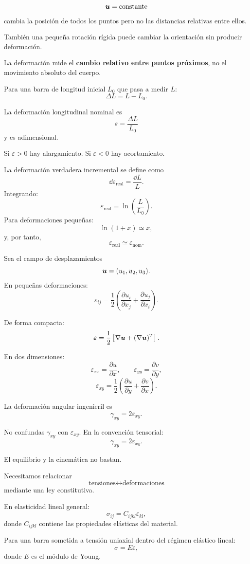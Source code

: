 \[
\boldsymbol{u}=\text{constante}
\]
cambia la posición de todos los puntos pero no las distancias relativas entre ellos.

También una pequeña rotación rígida puede cambiar la orientación sin producir deformación.

\begin{idea}
La deformación mide el \textbf{cambio relativo entre puntos próximos}, no el movimiento absoluto del cuerpo.
\end{idea}

Para una barra de longitud inicial $L_0$ que pasa a medir $L$:
\[
\Delta L=L-L_0.
\]

La deformación longitudinal nominal es
\[
\varepsilon=\frac{\Delta L}{L_0}
\]
y es adimensional.

Si $\varepsilon>0$ hay alargamiento. Si $\varepsilon<0$ hay acortamiento.

La deformación verdadera incremental se define como
\[
\dd\varepsilon_{\mathrm{real}}=\frac{\dd L}{L}.
\]
Integrando:
\[
\varepsilon_{\mathrm{real}}=\ln\left(\frac{L}{L_0}\right).
\]
Para deformaciones pequeñas:
\[
\ln(1+x)\simeq x,
\]
y, por tanto,
\[
\varepsilon_{\mathrm{real}}\simeq\varepsilon_{\mathrm{nom}}.
\]

Sea el campo de desplazamientos
\[
\boldsymbol{u}=(u_1,u_2,u_3).
\]
En pequeñas deformaciones:
\[
\varepsilon_{ij}
=\frac{1}{2}
\left(
\frac{\partial u_i}{\partial x_j}
+
\frac{\partial u_j}{\partial x_i}
\right).
\]

De forma compacta:
\[
\boldsymbol{\varepsilon}
=\frac12
\left[
\nabla\boldsymbol{u}+(\nabla\boldsymbol{u})^T
\right].
\]

En dos dimensiones:
\[
\varepsilon_{xx}=\frac{\partial u}{\partial x},\qquad
\varepsilon_{yy}=\frac{\partial v}{\partial y},
\]
\[
\varepsilon_{xy}
=\frac12\left(
\frac{\partial u}{\partial y}
+
\frac{\partial v}{\partial x}
\right).
\]

La deformación angular ingenieril es
\[
\gamma_{xy}=2\varepsilon_{xy}.
\]

\begin{errorbox}
No confundas $\gamma_{xy}$ con $\varepsilon_{xy}$. En la convención tensorial:
\[
\gamma_{xy}=2\varepsilon_{xy}.
\]
\end{errorbox}


El equilibrio y la cinemática no bastan.

Necesitamos relacionar
\[
\text{tensiones}\longleftrightarrow\text{deformaciones}
\]
mediante una ley constitutiva.

En elasticidad lineal general:
\[
\sigma_{ij}=C_{ijkl}\varepsilon_{kl},
\]
donde $C_{ijkl}$ contiene las propiedades elásticas del material.

Para una barra sometida a tensión uniaxial dentro del régimen elástico lineal:
\[
\sigma=E\varepsilon,
\]
donde $E$ es el módulo de Young.

